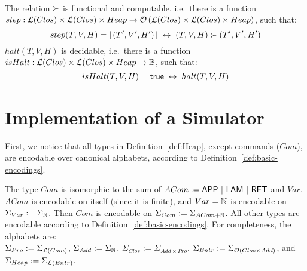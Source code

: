 \begin{lemma}
  \label{lem:heap-red}
  ~
  \begin{enumerate}
     \label{lem:step-iff}%
    The relation $\succ$ is functional and computable, i.e.\ there is a function
    $step : \mathcal{L}(Clos) \times \mathcal{L}(Clos) \times Heap \rightarrow \mathcal{O}\left(\mathcal{L}(Clos) \times \mathcal{L}(Clos) \times Heap\right)$, such that:
    \[
      step(T,V,H)=\left\lfloor {(T',V',H')} \right\rfloor ~\mathbin{\leftrightarrow}~ (T,V,H) \succ (T',V',H')
    \]
     \label{lem:halt_state_dec}%
    $halt(T,V,H)$ is decidable, i.e.\ there is a function $isHalt : \mathcal{L}(Clos) \times \mathcal{L}(Clos) \times Heap \rightarrow \mathbb{B}$, such that:
    \[
      isHalt(T,V,H) = \mathsf{true} ~\mathbin{\leftrightarrow}~ halt(T,V,H)
    \]
  \end{enumerate}
\end{lemma}


\section{Implementation of a Simulator}
\label{sec:heap-implementation}

First, we notice that all types in Definition~\ref{def:Heap}, except commands ($Com$), are encodable over canonical alphabets, according to
Definition~\ref{def:basic-encodings}.  %
\begin{definition}
  \label{def:Heap-encode}
  The type $Com$ is isomorphic to the sum of $ACom := \mathsf{APP} ~|~ \mathsf{LAM} ~|~ \mathsf{RET}$ and $Var$.  $ACom$ is encodable on itself (since it is
  finite), and $Var = \mathbb{N}$ is encodable on $\Sigma_{Var} := \Sigma_{\mathbb{N}}$.  Then $Com$ is encodable on $\Sigma_{Com} := \Sigma_{ACom+\mathbb{N}}$.  All
  other types are encodable according to Definition~\ref{def:basic-encodings}.
  For completeness, the alphabets are:\\
  $\Sigma_{Pro} := \Sigma_{\mathcal{L}(Com)}$, $\Sigma_{Add} := \Sigma_{\mathbb{N}}$, $\Sigma_{Clos}:=\Sigma_{Add \times Pro}$,
  $\Sigma_{Entr} := \Sigma_{\mathcal{O}(Clos \times Add)}$, and $\Sigma_{Heap} := \Sigma_{\mathcal{L}(Entr)}$.
\end{definition}

